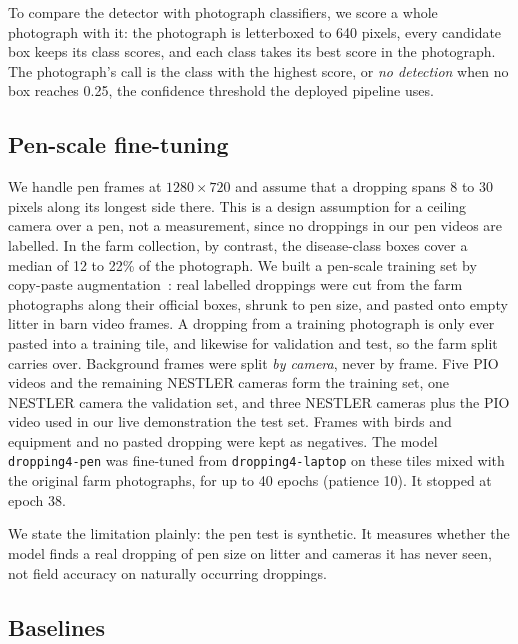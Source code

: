 To compare the detector with photograph classifiers, we score a whole photograph with it: the photograph is
letterboxed to 640 pixels, every candidate box keeps its class scores, and each class takes its best score in the
photograph. The photograph's call is the class with the highest score, or \emph{no detection} when no box reaches
0.25, the confidence threshold the deployed pipeline uses.

\subsection{Pen-scale fine-tuning}
\label{sec:pen}

We handle pen frames at $1280\times720$ and assume that a dropping spans 8 to 30 pixels along its longest side there.
This is a design assumption for a ceiling camera over a pen, not a measurement, since no droppings in our pen videos
are labelled. In the farm collection, by contrast, the disease-class boxes cover a median of 12 to 22\% of the
photograph. We built a pen-scale training set by copy-paste
augmentation~\cite{ghiasi2021}: real labelled droppings were cut from the farm photographs along their
official boxes, shrunk to pen size, and pasted onto empty litter in barn video frames. A dropping from a training
photograph is only ever pasted into a training tile, and likewise for validation and test, so the farm split carries
over. Background frames were split \emph{by camera}, never by frame. Five PIO videos and the remaining NESTLER cameras
form the training set, one NESTLER camera the validation set, and three NESTLER cameras plus the PIO video used in our
live demonstration the test set. Frames with birds and equipment and no pasted dropping were kept as negatives. The
model \texttt{dropping4-pen} was fine-tuned from \texttt{dropping4-laptop} on these tiles mixed with the original
farm photographs, for up to 40 epochs (patience 10). It stopped at epoch 38.

We state the limitation plainly: the pen test is synthetic. It measures whether the model finds a real dropping of
pen size on litter and cameras it has never seen, not field accuracy on naturally occurring droppings.

\subsection{Baselines}
\label{sec:bench}

